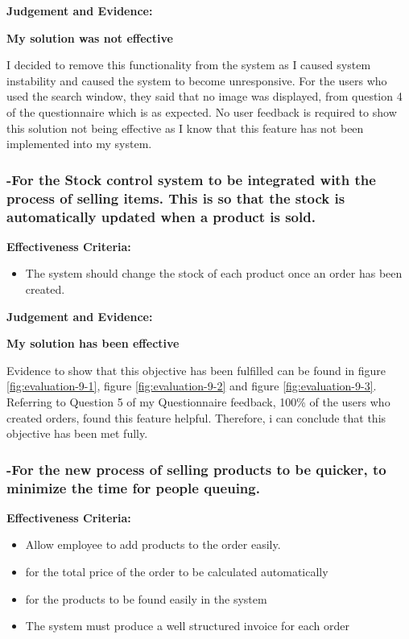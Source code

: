 \textbf{Judgement and Evidence:} \newline

\textbf{\large{My solution was not effective}}

I decided to remove this functionality from the system as I caused system instability and caused the system to become unresponsive. For the users who used the search window, they said that no image was displayed, from question 4 of the questionnaire which is as expected. No user feedback is required to show this solution not being effective as I know that this feature has not been implemented into my system.




\pagebreak
\subsubsection{-For the Stock control system to be integrated with the process of selling items. This is so that the stock is automatically updated when a product is sold.}
\label{stock-change-effectiveness}
\textbf{Effectiveness Criteria:}\newline
\begin{itemize}
	\item{The system should change the stock of each product once an order has been created.}
\end{itemize}

\textbf{Judgement and Evidence:} \newline

\textbf{\large{My solution has been effective}}

Evidence to show that this objective has been fulfilled can be found in figure \ref{fig:evaluation-9-1}, figure \ref{fig:evaluation-9-2} and figure \ref{fig:evaluation-9-3}. Referring to Question 5 of my Questionnaire feedback, 100\% of the users who created orders, found this feature helpful. Therefore, i can conclude that this objective has been met fully.




\pagebreak
\subsubsection{-For the new process of selling products to be quicker, to minimize the time for people queuing.}

\textbf{Effectiveness Criteria:}\newline
\begin{itemize}
	\item{Allow employee to add products to the order easily.}
	\item{for the total price of the order to be calculated automatically}
	\item{for the products to be found easily in the system}
	\item{The system must produce a well structured invoice for each order}
\end{itemize}

